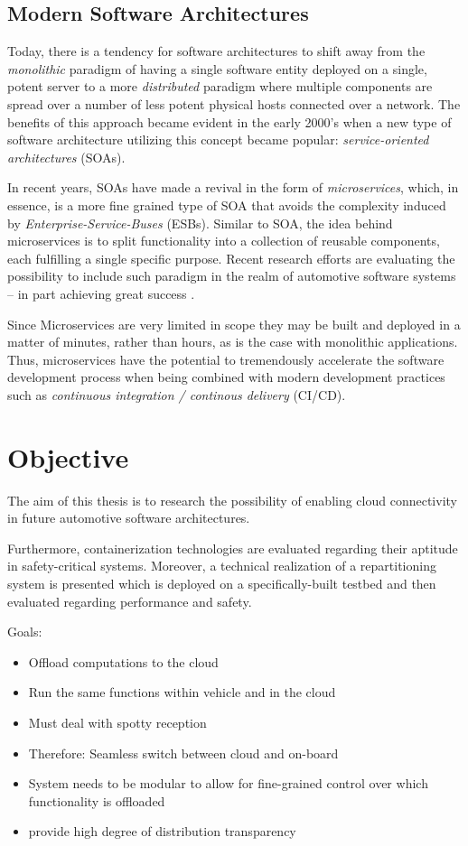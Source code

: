\subsection{Modern Software Architectures}
Today, there is a tendency for software architectures to shift away from the \emph{monolithic} paradigm of having a single software entity deployed on a single, potent server to a more \emph{distributed} paradigm where multiple components are spread over a number of less potent physical hosts connected over a network.
The benefits of this approach became evident in the early 2000's when a new type of software architecture utilizing this concept became popular: \emph{service-oriented architectures} (SOAs).

In recent years, SOAs have made a revival in the form of \emph{microservices}, which, in essence, is a more fine grained type of SOA that avoids the complexity induced by \emph{Enterprise-Service-Buses} (ESBs). Similar to SOA, the idea behind microservices is to split functionality into a collection of reusable components, each fulfilling a single specific purpose. Recent research efforts are evaluating the possibility to include such paradigm in the realm of automotive software systems -- in part achieving great success \cite{berger2017containerized}. 

Since Microservices are very limited in scope they may be built and deployed in a matter of minutes, rather than hours, as is the case with monolithic applications. Thus, microservices have the potential to tremendously accelerate the software development process when being combined with modern development practices such as \emph{continuous integration / continous delivery} (CI/CD).


%
%
%
%
%
%
%
%
%
%

\section{Objective}

The aim of this thesis is to research the possibility of enabling cloud connectivity in future automotive software architectures.
 
Furthermore, containerization technologies are evaluated regarding their aptitude in safety-critical systems. Moreover, a technical realization of a repartitioning system is presented which is deployed on a specifically-built testbed and then evaluated regarding performance and safety.


Goals:
\begin{itemize}
\item Offload computations to the cloud
\item Run the same functions within vehicle and in the cloud
\item Must deal with spotty reception
\item Therefore: Seamless switch between cloud and on-board
\item System needs to be modular to allow for fine-grained control over which functionality is offloaded 
\item provide high degree of distribution transparency
\end{itemize}


